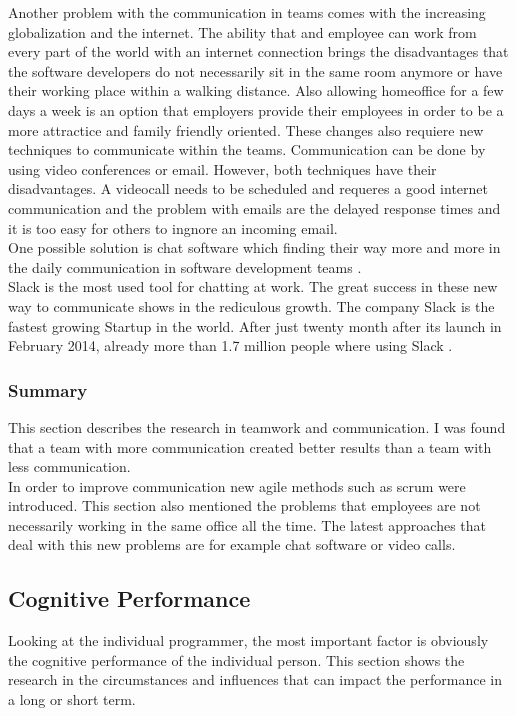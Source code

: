 \bigbreak
Another problem with the communication in teams comes with the increasing globalization and the internet. The ability that and employee can work from every part of the world with an internet connection brings the disadvantages that the software developers do not necessarily sit in the same room anymore or have their working place within a walking distance. 
Also allowing homeoffice for a few days a week is an option that employers provide their employees in order to be a more attractice and family friendly oriented. These changes also requiere new techniques to communicate within the teams. Communication can be done by using video conferences or email. However, both techniques have their disadvantages. A videocall needs to be scheduled and requeres a good internet communication and the problem with emails are the delayed response times and it is too easy for others to ingnore an incoming email\cite{carmel1999global}.\\
One possible solution is chat software which finding their way more and more in the daily communication in software development teams \cite{jarvenpaa1998communication}.\\ 
Slack is the most used tool for chatting at work. The great success in these new way to communicate shows in the rediculous growth. The company Slack is the fastest growing Startup in the world. After just twenty month after its launch in February 2014, already more than 1.7 million people where using Slack  \cite{bercovici2015}.

\subsubsection{Summary} 
This section describes the research in teamwork and communication. I was found that a team with more communication created better results than a team with less communication. \\
In order to improve communication new agile methods such as scrum were introduced. This section also mentioned the problems that employees are not necessarily working in the same office all the time. The latest approaches that deal with this new problems are for example chat software or video calls. 


\subsection{Cognitive Performance}
Looking at the individual programmer, the most important factor is obviously the cognitive performance of the individual person. This section shows the research in the circumstances and influences that can impact the performance in a long or short term. 

